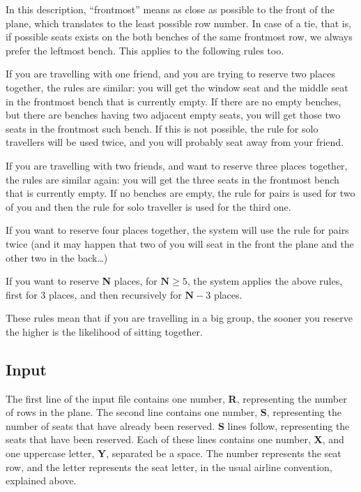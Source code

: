 \documentclass[11pt]{report}
\begin{document}
In this description, “frontmost” means as close as possible to the front of the
plane, which translates to the least possible row number. In case of a tie, that
is, if possible seats exists on the both benches of the same frontmost row, we
always prefer the leftmost bench. This applies to the following rules too.

If you are travelling with one friend, and you are trying to reserve two places together, the rules are similar: you will get the window seat and the middle seat in the frontmost bench that is currently empty. If there are no empty benches, but there are benches having two adjacent empty seats, you will get those two seats in the frontmost such bench. If this is not possible, the rule for solo travellers will be used twice, and you will probably seat away from your friend.

If you are travelling with two friends, and want to reserve three places together, the rules are similar again: you will get the three seats in the frontmost bench that is currently empty. If no benches are empty, the rule for pairs is used for two of you and then the rule for solo traveller is used for the third one.

If you want to reserve four places together, the system will use the rule for pairs twice (and it may happen that two of you will seat in the front the plane and the other two in the back…)

If you want to reserve \textbf{N} places, for $\textbf{N} \geq 5$, the system applies the above rules, first for 3 places, and then recursively for $\textbf{N}-3$ places.

These rules mean that if you are travelling in a big group, the sooner you
reserve the higher is the likelihood of sitting together.

\subsection*{Input}

The first line of the input file contains one number, \textbf{R}, representing the number of rows in the plane.
The second line contains one number, \textbf{S}, representing the number of seats that have already been reserved.
\textbf{S} lines follow, representing the seats that have been reserved. Each of
these lines contains one number, \textbf{X}, and one uppercase letter, \textbf{Y},
separated be a space. The number represents the seat row, and the letter
represents the seat letter, in the usual airline convention, explained above.
\end{document}
